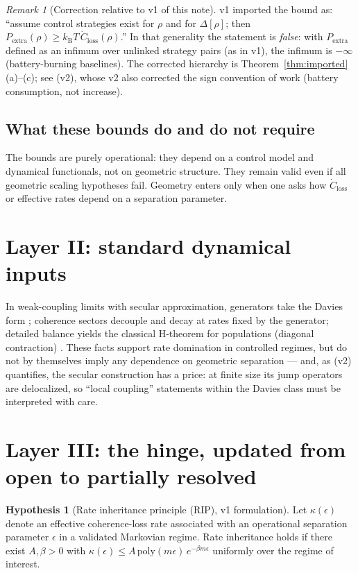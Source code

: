 \documentclass[11pt,a4paper]{article}
\theoremstyle{plain}
\theoremstyle{definition}
\newtheorem{hypothesis}[theorem]{Hypothesis}
\theoremstyle{remark}
\newtheorem{remark}[theorem]{Remark}
\newcommand{\kB}{k_{\mathrm{B}}}
\begin{document}
\begin{remark}[Correction relative to v1 of this note]\label{rem:importfix}
v1 imported the bound as: ``assume control strategies exist for $\rho$ and for
$\Delta[\rho]$; then $P_{\mathrm{extra}}(\rho) \ge \kB
T\,\dot{C}_{\mathrm{loss}}(\rho)$.'' In that generality the statement is
\emph{false}: with $P_{\mathrm{extra}}$ defined as an infimum over unlinked
strategy pairs (as in \cite{MaintWork} v1), the infimum is $-\infty$
(battery-burning baselines). The corrected hierarchy is
Theorem~\ref{thm:imported}(a)--(c); see \cite{MaintWork} (v2), whose v2 also
corrected the sign convention of work (battery consumption, not increase).
\end{remark}

\subsection{What these bounds do and do not require}

The bounds are purely operational: they depend on a control model and
dynamical functionals, not on geometric structure. They remain valid even if
all geometric scaling hypotheses fail. Geometry enters only when one asks how
$\dot{C}_{\mathrm{loss}}$ or effective rates depend on a separation parameter.

\section{Layer II: standard dynamical inputs}

In weak-coupling limits with secular approximation, generators take the Davies
form \cite{Davies74,BreuerPetruccione}; coherence sectors decouple and decay
at rates fixed by the generator; detailed balance yields the classical
H-theorem for populations (diagonal contraction) \cite{Spohn78}. These facts
support rate domination in controlled regimes, but do not by themselves imply
any dependence on geometric separation --- and, as \cite{Stress} (v2)
quantifies, the secular construction has a price: at finite size its jump
operators are delocalized, so ``local coupling'' statements within the Davies
class must be interpreted with care.

\section{Layer III: the hinge, updated from open to partially resolved}

\begin{hypothesis}[Rate inheritance principle (RIP), v1 formulation]
\label{hyp:rip}
Let $\kappa(\epsilon)$ denote an effective coherence-loss rate associated with
an operational separation parameter $\epsilon$ in a validated Markovian
regime. Rate inheritance holds if there exist $A, \beta > 0$ with
$\kappa(\epsilon) \le A\,\mathrm{poly}(m\epsilon)\, e^{-\beta m\epsilon}$
uniformly over the regime of interest.
\end{hypothesis}
\end{document}
